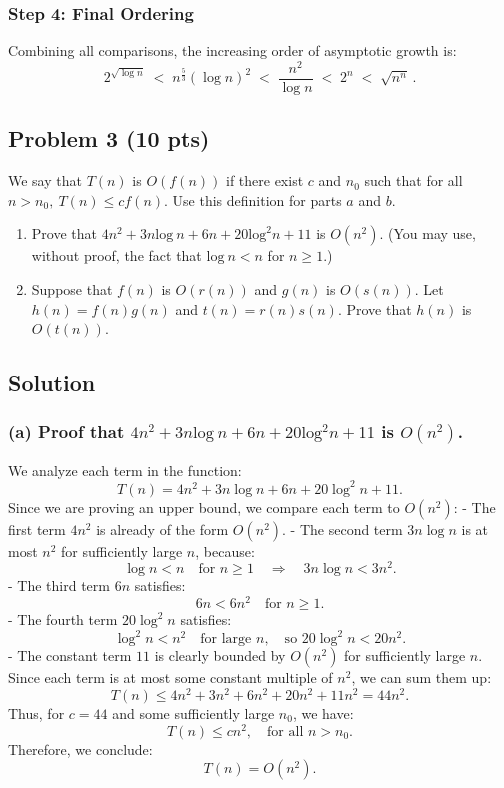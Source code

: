 \documentclass[12pt]{article}
\begin{document}
\subsubsection*{Step 4: Final Ordering}
Combining all comparisons, the increasing order of asymptotic growth is:
\[
\boxed{
2^{\sqrt{\log n}} 
\;<\; 
n^{\tfrac{5}{3}} (\log n)^2 
\;<\; 
\frac{n^2}{\log n} 
\;<\; 
2^n 
\;<\; 
\sqrt{n^n}\,.
}
\]

\subsection*{Problem 3 (10 pts)}
We say that $T(n)$ is $O(f(n))$ if there exist $c$ and $n_0$ such that for all $n > n_0,\:T(n) \le cf(n)$. Use this definition for parts $a$ and $b$.
\begin{enumerate}
    \item Prove that $4n^2 + 3n\text{log}\:n + 6n + 20\text{log}^2n + 11$ is $O(n^2)$. (You may use, without proof, the fact that $\text{log}\:n < n$ for $n \ge 1$.)
    \item Suppose that $f(n)$ is $O(r(n))$ and $g(n)$ is $O(s(n))$. Let $h(n) = f(n)g(n)$ and $t(n) = r(n)s(n)$. Prove that $h(n)$ is $O(t(n))$.
\end{enumerate}

\subsection*{Solution}

\subsubsection*{(a) Proof that $4n^2 + 3n\text{log}\:n + 6n + 20\text{log}^2n + 11$ is $O(n^2)$.}

We analyze each term in the function:
\[
T(n) = 4n^2 + 3n\log n + 6n + 20\log^2 n + 11.
\]
Since we are proving an upper bound, we compare each term to \( O(n^2) \):
- The first term \( 4n^2 \) is already of the form \( O(n^2) \).
- The second term \( 3n \log n \) is at most \( n^2 \) for sufficiently large \( n \), because:
  \[
  \log n < n \quad \text{for } n \geq 1 \quad \Rightarrow \quad 3n \log n < 3n^2.
  \]
- The third term \( 6n \) satisfies:
  \[
  6n < 6n^2 \quad \text{for } n \geq 1.
  \]
- The fourth term \( 20\log^2 n \) satisfies:
  \[
  \log^2 n < n^2 \quad \text{for large } n, \quad \text{so } 20\log^2 n < 20n^2.
  \]
- The constant term \( 11 \) is clearly bounded by \( O(n^2) \) for sufficiently large \( n \).
Since each term is at most some constant multiple of \( n^2 \), we can sum them up:
\[
T(n) \leq 4n^2 + 3n^2 + 6n^2 + 20n^2 + 11n^2 = 44n^2.
\]
Thus, for \( c = 44 \) and some sufficiently large \( n_0 \), we have:
\[
T(n) \leq c n^2, \quad \text{for all } n > n_0.
\]
Therefore, we conclude:
\[
T(n) = O(n^2).
\]
\end{document}
